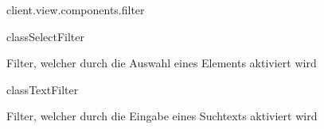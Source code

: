 \begin{texdocpackage}{client.view.components.filter}
\begin{texdocclass}{class}{SelectFilter}
\label{texdoclet:edu.kit.informatik.studyplan.client.view.components.filter.SelectFilter}
\begin{texdocclassintro}
Filter, welcher durch die Auswahl eines Elements aktiviert wird\end{texdocclassintro}
\begin{texdocclassconstructors}
\end{texdocclassconstructors}
\begin{texdocclassmethods}
\end{texdocclassmethods}
\end{texdocclass}


\begin{texdocclass}{class}{TextFilter}
\label{texdoclet:edu.kit.informatik.studyplan.client.view.components.filter.TextFilter}
\begin{texdocclassintro}
Filter, welcher durch die Eingabe eines Suchtexts aktiviert wird\end{texdocclassintro}
\begin{texdocclassconstructors}
\end{texdocclassconstructors}
\begin{texdocclassmethods}
\end{texdocclassmethods}
\end{texdocclass}


\end{texdocpackage}



